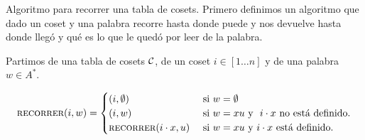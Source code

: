 \documentclass[aspectratio=169, 9pt]{beamer}
\newcommand{\edeff}{\textsc{estáDefinido}}
\newcommand{\recorrer}{\textsc{recorrer}}
\newcommand{\In}{[1 \dots n]}
\newcommand{\Co}{{\cal{C}}}
\begin{document}
\begin{frame}[fragile]{Algoritmo para recorrer una tabla de cosets.}
	Primero definimos un algoritmo que dado un coset y una palabra recorre hasta donde puede y nos devuelve hasta donde llegó y qué es lo que le quedó por leer de la palabra.
	

	Partimos de una tabla de cosets $\Co$, de un coset $i \in \In$ y de una palabra $w \in A^*$.
		
	\begin{equation*}
		\textsc{recorrer}(i,w) = 
		\begin{cases}
			(i, \emptyset) \ \ &\text{si} \ w = \emptyset \\
			(i, w) \  &\text{si} \ w = xu \  \text{y} \ \ i \cdot x \ \text{no está definido.} \\
			\textsc{recorrer}(i \cdot x, u) \ &\text{si} \ w = xu \ \text{y} \  i \cdot x  \text{ está definido.} \\
		\end{cases}
	\end{equation*}

	
	
	
	
	
\end{frame}
\end{document}
